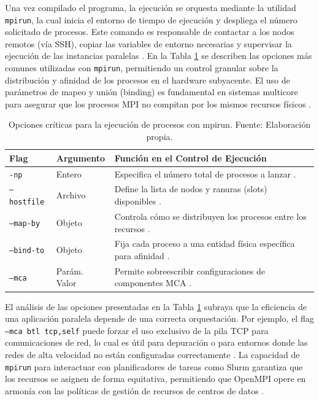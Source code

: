 Una vez compilado el programa, la ejecución se orquesta mediante la utilidad \texttt{mpirun}, la cual inicia el entorno de tiempo de ejecución y despliega el número solicitado de procesos. Este comando es responsable de contactar a los nodos remotos (vía SSH), copiar las variables de entorno necesarias y supervisar la ejecución de las instancias paralelas \cite{ref11_cristian_OpenMPI_FAQ, ref4_cristian_Graham2005}. En la Tabla \ref{tab:mpirun_flags} se describen las opciones más comunes utilizadas con \texttt{mpirun}, permitiendo un control granular sobre la distribución y afinidad de los procesos en el hardware subyacente. El uso de parámetros de mapeo y unión (binding) es fundamental en sistemas multicore para asegurar que los procesos MPI no compitan por los mismos recursos físicos \cite{ref5_cristian_Graham2006, ref10_cristian_Ammendola2012}.

\begin{table}[H]
    \centering
    \caption{Opciones críticas para la ejecución de procesos con mpirun. Fuente: Elaboración propia.}
    \label{tab:mpirun_flags}
    \begin{tabular}{|l|l|p{7cm}|}
    \hline
    \textbf{Flag} & \textbf{Argumento} & \textbf{Función en el Control de Ejecución} \\ \hline
    \texttt{-np} & Entero & Especifica el número total de procesos a lanzar \cite{ref11_cristian_OpenMPI_FAQ}. \\ \hline
    \texttt{--hostfile} & Archivo & Define la lista de nodos y ranuras (slots) disponibles \cite{ref11_cristian_OpenMPI_FAQ}. \\ \hline
    \texttt{--map-by} & Objeto & Controla cómo se distribuyen los procesos entre los recursos \cite{ref5_cristian_Graham2006}. \\ \hline
    \texttt{--bind-to} & Objeto & Fija cada proceso a una entidad física específica para afinidad \cite{ref10_cristian_Ammendola2012}. \\ \hline
    \texttt{--mca} & Parám. Valor & Permite sobreescribir configuraciones de componentes MCA \cite{ref7_cristian_Squyres2004}. \\ \hline
    \end{tabular}
\end{table}

El análisis de las opciones presentadas en la Tabla \ref{tab:mpirun_flags} subraya que la eficiencia de una aplicación paralela depende de una correcta orquestación. Por ejemplo, el flag \texttt{--mca btl tcp,self} puede forzar el uso exclusivo de la pila TCP para comunicaciones de red, lo cual es útil para depuración o para entornos donde las redes de alta velocidad no están configuradas correctamente \cite{ref5_cristian_Graham2006, ref7_cristian_Squyres2004}. La capacidad de \texttt{mpirun} para interactuar con planificadores de tareas como Slurm garantiza que los recursos se asignen de forma equitativa, permitiendo que OpenMPI opere en armonía con las políticas de gestión de recursos de centros de datos \cite{ref11_cristian_OpenMPI_FAQ}.

